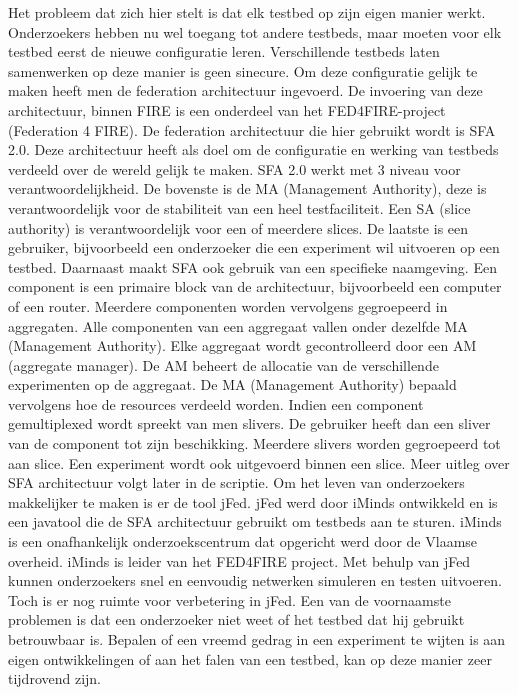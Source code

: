\npar
Het probleem dat zich hier stelt is dat elk testbed op zijn eigen manier werkt. Onderzoekers hebben nu wel toegang tot andere testbeds, maar moeten voor elk testbed eerst de nieuwe configuratie leren. Verschillende testbeds laten samenwerken op deze manier is geen sinecure. Om deze configuratie gelijk te maken heeft men de federation architectuur ingevoerd. De invoering van deze architectuur, binnen FIRE is een onderdeel van het FED4FIRE-project (Federation 4 FIRE). De federation architectuur die hier gebruikt wordt is SFA 2.0. Deze architectuur heeft als doel om de configuratie en werking van testbeds verdeeld over de wereld gelijk te maken.
\npar
SFA 2.0 werkt met 3 niveau voor verantwoordelijkheid. De bovenste is de MA (Management Authority), deze is verantwoordelijk voor de stabiliteit van een heel testfaciliteit. Een SA (slice authority) is verantwoordelijk voor een of meerdere slices. De laatste is een gebruiker, bijvoorbeeld een onderzoeker die een experiment wil uitvoeren op een testbed.
\npar
Daarnaast maakt SFA ook gebruik van een specifieke naamgeving. Een component is een primaire block van de architectuur, bijvoorbeeld een computer of een router. Meerdere componenten worden vervolgens gegroepeerd in aggregaten. Alle componenten van een aggregaat vallen onder dezelfde MA (Management Authority). Elke aggregaat wordt gecontrolleerd door een AM (aggregate manager). De AM beheert de allocatie van de verschillende experimenten op de aggregaat.
\npar
De MA (Management Authority) bepaald vervolgens hoe de resources verdeeld worden. Indien een component gemultiplexed wordt spreekt van men slivers. De gebruiker heeft dan een sliver van de component tot zijn beschikking. Meerdere slivers worden gegroepeerd tot aan slice. Een experiment wordt ook uitgevoerd binnen een slice. Meer uitleg over SFA architectuur volgt later in de scriptie.
\npar
Om het leven van onderzoekers makkelijker te maken is er de tool jFed.
jFed werd door iMinds ontwikkeld\citep{iminds-jFed} en is een javatool die de SFA architectuur gebruikt om testbeds aan te sturen.
iMinds is een onafhankelijk onderzoekscentrum dat opgericht werd door de Vlaamse overheid\citep{iMinds-what-is}. iMinds is leider van het FED4FIRE project\citep{iminds-FED4FIRE}.
\npar
Met behulp van jFed kunnen onderzoekers snel en eenvoudig netwerken simuleren en testen uitvoeren. Toch is er nog ruimte voor verbetering in jFed. Een van de voornaamste problemen is dat een onderzoeker niet weet of het testbed dat hij gebruikt betrouwbaar is. Bepalen of een vreemd gedrag in een experiment te wijten is aan eigen ontwikkelingen of aan het falen van een testbed, kan op deze manier zeer tijdrovend zijn.
